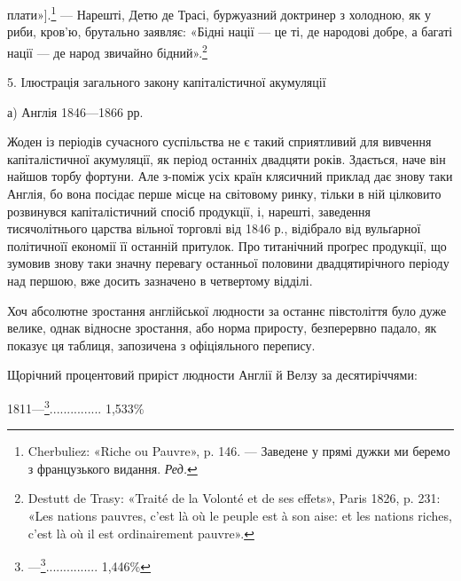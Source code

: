 плати»].\footnote*{
Cherbuliez: «Riche ou Pauvre», p. 146. — Заведене у прямі дужки
ми беремо з французького видання. \emph{Ред.}
} — Нарешті, Детю де Трасі, буржуазний доктринер з
холодною, як у риби, кров’ю, брутально заявляє: «Бідні нації —
це ті, де народові добре, а багаті нації — де народ звичайно бідний».\footnote{
Destutt de Trasy: «Traité de la Volonté et de ses effets», Paris
1826, p. 231: «Les nations pauvres, c’est là où le peuple est à son aise: et
les nations riches, c’est là où il est ordinairement pauvre».
}

5. Ілюстрація загального закону капіталістичної акумуляції

а) Англія 1846—1866 рр.

Жоден із періодів сучасного суспільства не є такий сприятливий
для вивчення капіталістичної акумуляції, як період останніх
двадцяти років. Здається, наче він найшов торбу фортуни.
Але з-поміж усіх країн клясичний приклад дає знову таки
Англія, бо вона посідає перше місце на світовому ринку,
тільки в ній цілковито розвинувся капіталістичний спосіб продукції,
і, нарешті, заведення тисячолітнього царства вільної
торговлі від 1846 р., відібрало від вульґарної політичноїї економії
її останній притулок. Про титанічний проґрес продукції, що зумовив
знову таки значну перевагу останньої половини двадцятирічного
періоду над першою, вже досить зазначено в четвертому
відділі.

Хоч абсолютне зростання англійської людности за останнє півстоліття
було дуже велике, однак відносне зростання, або норма
приросту, безперервно падало, як показує ця таблиця, запозичена
з офіціяльного перепису.

Щорічний процентовий приріст людности Англії й Велзу
за десятиріччями:

1811—\footnote{
—\footnote{
—\footnote{
—\footnote{
—1861...............1,141\%

Розгляньмо тепер, з другого боку, зростання багатства. Найпевнішу
точку опори дає тут рух зисків, земельних рент і т. ін.,
що підлягають прибутковому оподаткуванню. Приріст зисків, що
підпадають оподаткуванню (фармерів і деяких інших рубрик сюди
не включено), становив для Великобританії від 1853 до 1864 р.
50,47\% (або 4,58\% пересічно за рік),\footnote{
«Tenth Report of the Commissioners of H. M’s. Inland Revenue».
London 1866, p. 38.
} приріст людности протягом
того самого періоду — приблизно 12\%. Збільшення земельних
рент, що підпадають оподаткуванню (сюди належать
будинки, залізниці, копальні, рибальство й т. ін.), становило
від 1853 до 1864 р. 38\%, або 3\% річно, при чому найдужче
збільшення припадало на такі рубрики:
}............... 1,216\%
}...............  1,326\%
}............... 1,446\%
}............... 1,533\%